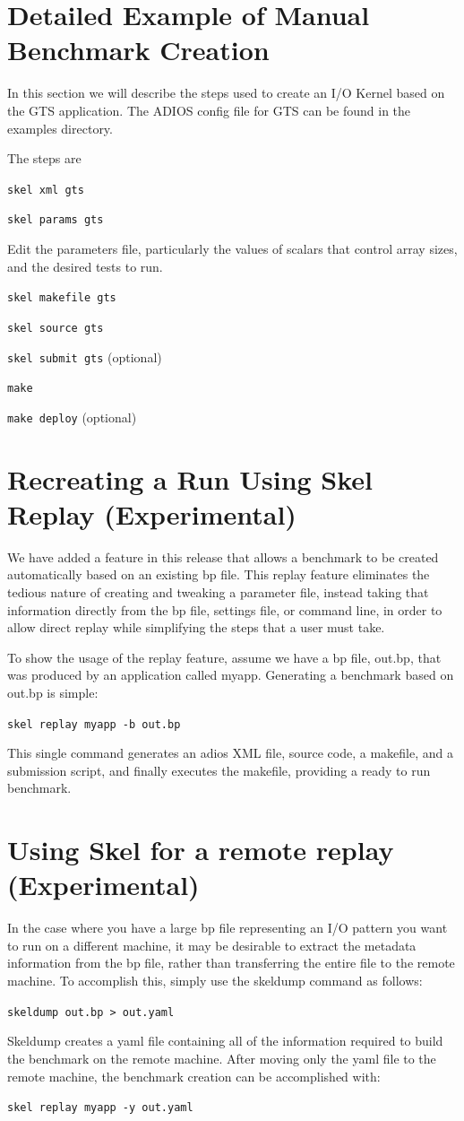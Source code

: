 \section{Detailed Example of Manual Benchmark Creation}
In this section we will describe the steps used to create an I/O Kernel based
on the GTS application. The ADIOS config file for GTS can be found in the
examples directory.

The steps are

{\tt skel xml gts}

{\tt skel params gts}

Edit the parameters file, particularly the values of scalars that control array sizes,
and the desired tests to run.

{\tt skel makefile gts}

{\tt skel source gts}

{\tt skel submit gts} (optional)

{\tt make}

{\tt make deploy} (optional)



\section{Recreating a Run Using Skel Replay (Experimental)}
We have added a feature in this release that allows a benchmark to be created
automatically based on an existing bp file. This replay feature eliminates the
tedious nature of creating and tweaking a parameter file, instead taking that 
information directly from the bp file, settings file, or command line, in order
to allow direct replay while simplifying the steps that a user must take.

To show the usage of the replay feature, assume we have a bp file, out.bp,
that was produced by an application called myapp. Generating a benchmark based on out.bp is simple: 

{\tt skel replay myapp -b out.bp}

This single command generates an adios XML file, source code, a makefile, and a submission script, and finally executes the makefile, providing a ready to run benchmark.

\section{Using Skel for a remote replay (Experimental)}

In the case where you have a large bp file representing an I/O pattern you want to run
on a different machine, it may be desirable to extract the metadata information from the
bp file, rather than transferring the entire file to the remote machine. To
accomplish this, simply use the skeldump command as follows:

{\tt skeldump out.bp > out.yaml}

Skeldump creates a yaml file containing all of the information required to build the
benchmark on the remote machine. After moving only the yaml file to the remote machine,
the benchmark creation can be accomplished with:

{\tt skel replay myapp -y out.yaml}

